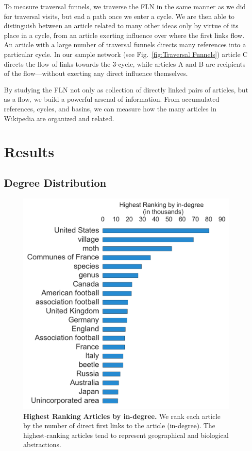 \documentclass[pre,twocolumn,twoside,superscriptaddress,floatfix, aps, 10pt]{revtex4-1}
\begin{document}
To measure traversal funnels, we traverse the FLN in the same manner as we 
did for traversal visits, but end a path once we enter a cycle.
We are then able to distinguish between an article related to many other ideas
only by virtue of its place in a cycle, from an article exerting influence over where the first links flow. 
An article with a large number of traversal funnels directs many references
into a particular cycle. In our sample network 
(see Fig.~\ref{fig:Traversal Funnels}) article C 
directs the flow of links towards the 3-cycle, while articles A and B are 
recipients of the flow---without exerting any direct influence themselves. 

By studying the FLN not only as collection of directly linked pairs of articles, but
as a flow, 
we build a powerful arsenal of information.
From accumulated references, cycles, and basins, we can measure how the many articles in Wikipedia are organized and related.





\section{Results}

\subsection{Degree Distribution}

\begin{figure}[tp!]
  \includegraphics[width=\columnwidth]{graphics/articles_ndegree.png}
  \caption{
    \textbf{Highest Ranking Articles by in-degree.}
We rank each article by the number of direct first links to the article (in-degree). The highest-ranking articles tend to represent geographical and biological abstractions.}
  \label{fig:indegree list}
\end{figure}
\end{document}
